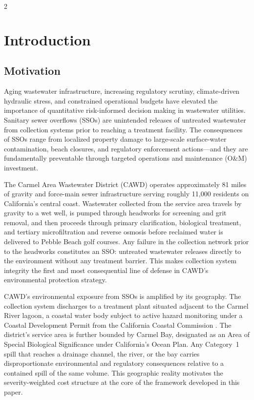 \documentclass[10pt]{article}
\begin{document}
\begin{multicols}{2}

\section{Introduction}
 
\subsection{Motivation}
 
Aging wastewater infrastructure, increasing regulatory scrutiny,
climate-driven hydraulic stress, and constrained operational budgets have
elevated the importance of quantitative risk-informed decision making in
wastewater utilities. Sanitary sewer overflows (SSOs) are unintended
releases of untreated wastewater from collection systems prior to reaching
a treatment facility. The consequences of SSOs range from localized
property damage to large-scale surface-water contamination, beach closures,
and regulatory enforcement actions---and they are fundamentally preventable
through targeted operations and maintenance (O\&M) investment.
 
The Carmel Area Wastewater District (CAWD) operates approximately 81 miles
of gravity and force-main sewer infrastructure serving roughly
11{,}000 residents on California's central coast. Wastewater collected
from the service area travels by gravity to a wet well, is pumped through
headworks for screening and grit removal, and then proceeds through primary
clarification, biological treatment, and tertiary microfiltration and
reverse osmosis before reclaimed water is delivered to Pebble Beach golf
courses. Any failure in the collection network prior to the headworks
constitutes an SSO: untreated wastewater releases directly to the
environment without any treatment barrier. This makes collection system
integrity the first and most consequential line of defense in CAWD's
environmental protection strategy.
 
CAWD's environmental exposure from SSOs is amplified by its geography.
The collection system discharges to a treatment plant situated adjacent to
the Carmel River lagoon, a coastal water body subject to active hazard
monitoring under a Coastal Development Permit from the California Coastal
Commission \citep{cawd_hazards2025}. The district's service area is further
bounded by Carmel Bay, designated as an Area of Special Biological
Significance under California's Ocean Plan. Any Category~1 spill that
reaches a drainage channel, the river, or the bay carries disproportionate
environmental and regulatory consequences relative to a contained spill of
the same volume. This geographic reality motivates the severity-weighted
cost structure at the core of the framework developed in this paper.
 

\end{multicols}
\end{document}

